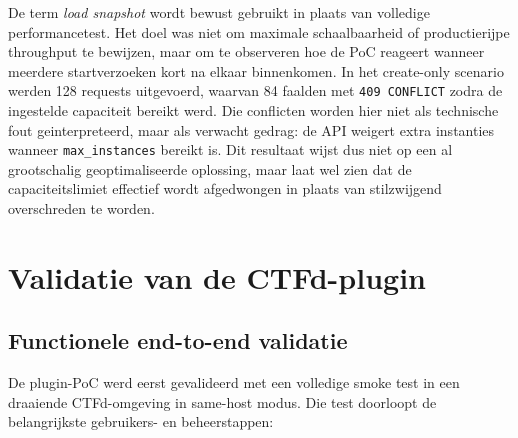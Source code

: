 De term \textit{load snapshot} wordt bewust gebruikt in plaats van volledige performancetest. Het doel was niet om maximale schaalbaarheid of productierijpe throughput te bewijzen, maar om te observeren hoe de PoC reageert wanneer meerdere startverzoeken kort na elkaar binnenkomen. In het create-only scenario werden 128 requests uitgevoerd, waarvan 84 faalden met \texttt{409 CONFLICT} zodra de ingestelde capaciteit bereikt werd. Die conflicten worden hier niet als technische fout geinterpreteerd, maar als verwacht gedrag: de API weigert extra instanties wanneer \texttt{max\_instances} bereikt is. Dit resultaat wijst dus niet op een al grootschalig geoptimaliseerde oplossing, maar laat wel zien dat de capaciteitslimiet effectief wordt afgedwongen in plaats van stilzwijgend overschreden te worden.

\section{Validatie van de CTFd-plugin}%
\label{sec:validatie-plugin}

\subsection{Functionele end-to-end validatie}

De plugin-PoC werd eerst gevalideerd met een volledige smoke test in een draaiende CTFd-omgeving in same-host modus. Die test doorloopt de belangrijkste gebruikers- en beheerstappen:

